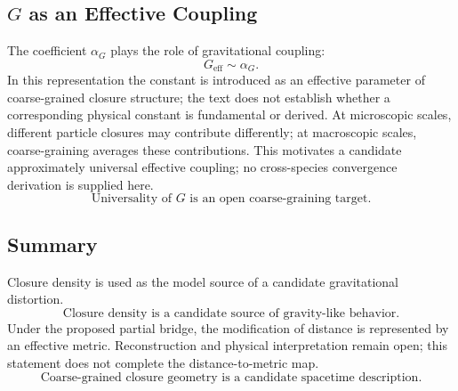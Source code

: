 \subsection{$G$ as an Effective Coupling}

The coefficient $\alpha_G$ plays the role of gravitational coupling:
\begin{equation}
  \boxed{G_{\text{eff}} \sim \alpha_G.}
\end{equation}
In this representation the constant is introduced as an effective parameter
of coarse-grained closure structure; the text does not establish whether a
corresponding physical constant is fundamental or derived.
At microscopic scales, different particle closures may contribute differently;
at macroscopic scales, coarse-graining averages these contributions.
This motivates a candidate approximately universal effective coupling; no
cross-species convergence derivation is supplied here.
\begin{equation}
  \boxed{\text{Universality of } G \text{ is an open coarse-graining target.}}
\end{equation}

\subsection{Summary}

Closure density is used as the model source of a candidate gravitational
distortion.
\begin{equation}
  \boxed{\text{Closure density is a candidate source of gravity-like behavior.}}
\end{equation}
Under the proposed partial bridge, the modification of distance is represented
by an effective metric. Reconstruction and physical interpretation remain
open; this statement does not complete the distance-to-metric map.
\begin{equation}
  \boxed{\text{Coarse-grained closure geometry is a candidate spacetime description.}}
\end{equation}
